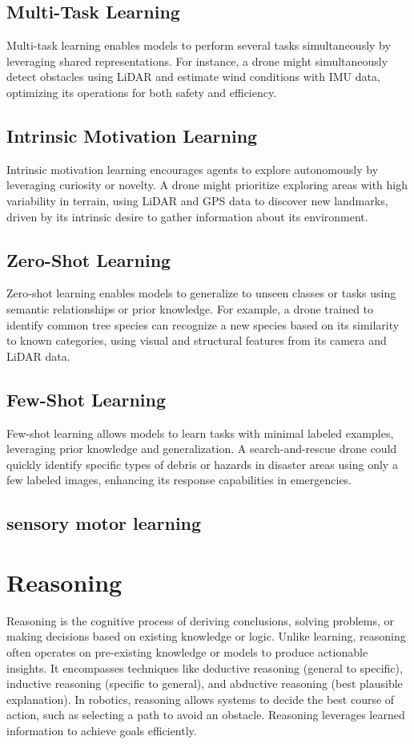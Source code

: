 \subsection{Multi-Task Learning}
Multi-task learning enables models to perform several tasks simultaneously by leveraging shared representations. For instance, a drone might simultaneously detect obstacles using LiDAR and estimate wind conditions with IMU data, optimizing its operations for both safety and efficiency. 

\subsection{Intrinsic Motivation Learning}
Intrinsic motivation learning encourages agents to explore autonomously by leveraging curiosity or novelty. A drone might prioritize exploring areas with high variability in terrain, using LiDAR and GPS data to discover new landmarks, driven by its intrinsic desire to gather information about its environment. 

\subsection{Zero-Shot Learning}
Zero-shot learning enables models to generalize to unseen classes or tasks using semantic relationships or prior knowledge. For example, a drone trained to identify common tree species can recognize a new species based on its similarity to known categories, using visual and structural features from its camera and LiDAR data. 

\subsection{Few-Shot Learning}
Few-shot learning allows models to learn tasks with minimal labeled examples, leveraging prior knowledge and generalization. A search-and-rescue drone could quickly identify specific types of debris or hazards in disaster areas using only a few labeled images, enhancing its response capabilities in emergencies. 

\subsection{sensory motor learning}

\section{Reasoning}
Reasoning is the cognitive process of deriving conclusions, solving problems, or making decisions based on existing knowledge or logic. Unlike learning, reasoning often operates on pre-existing knowledge or models to produce actionable insights. It encompasses techniques like deductive reasoning (general to specific), inductive reasoning (specific to general), and abductive reasoning (best plausible explanation). In robotics, reasoning allows systems to decide the best course of action, such as selecting a path to avoid an obstacle. Reasoning leverages learned information to achieve goals efficiently. 

